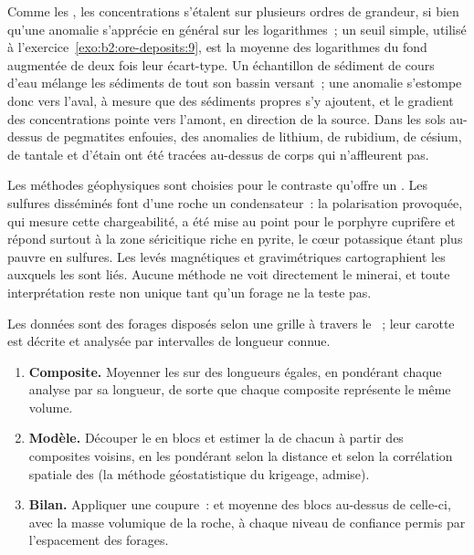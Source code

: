 Comme les , les concentrations s'étalent sur plusieurs ordres de grandeur, si bien qu'une anomalie
s'apprécie en général sur les logarithmes~; un seuil simple, utilisé à l'exercice~\ref{exo:b2:ore-deposits:9},
est la moyenne des logarithmes du fond augmentée de deux fois leur écart-type. Un échantillon de sédiment
de cours d'eau mélange les sédiments de tout son bassin versant~; une anomalie s'estompe donc vers
l'aval, à mesure que des sédiments propres s'y ajoutent, et le gradient des concentrations pointe vers l'amont,
en direction de la source. Dans les sols au-dessus de pegmatites enfouies, des anomalies de lithium,
de rubidium, de césium, de tantale et d'étain ont été tracées au-dessus de corps qui n'affleurent pas.

Les méthodes géophysiques sont choisies pour le contraste qu'offre un . Les sulfures
disséminés font d'une roche un condensateur~: la polarisation provoquée, qui mesure cette chargeabilité,
a été mise au point pour le porphyre cuprifère et répond surtout à la zone séricitique
riche en pyrite, le cœur potassique étant plus pauvre en sulfures. Les levés magnétiques et gravimétriques
cartographient les  auxquels les  sont liés. Aucune méthode ne voit directement
le minerai, et toute interprétation reste non unique tant qu'un forage ne la teste pas.

\begin{method}\label{met:b2:ore-deposits:resource}
Les données sont des forages disposés selon une grille à travers le ~;
leur carotte est décrite et analysée par intervalles de longueur connue.
\begin{enumerate}
  \item \textbf{Composite.} Moyenner les  sur des longueurs égales, en pondérant chaque analyse par sa
        longueur, de sorte que chaque composite représente le même volume.
  \item \textbf{Modèle.} Découper le  en blocs et estimer la  de chacun à partir des composites voisins,
        en les pondérant selon la distance et selon la corrélation spatiale des  (la méthode géostatistique
        du krigeage, admise).
  \item \textbf{Bilan.} Appliquer une coupure~:  et  moyenne des blocs au-dessus de celle-ci, avec
        la masse volumique de la roche, à chaque niveau de confiance permis par l'espacement des forages.
\end{enumerate}
\end{method}

